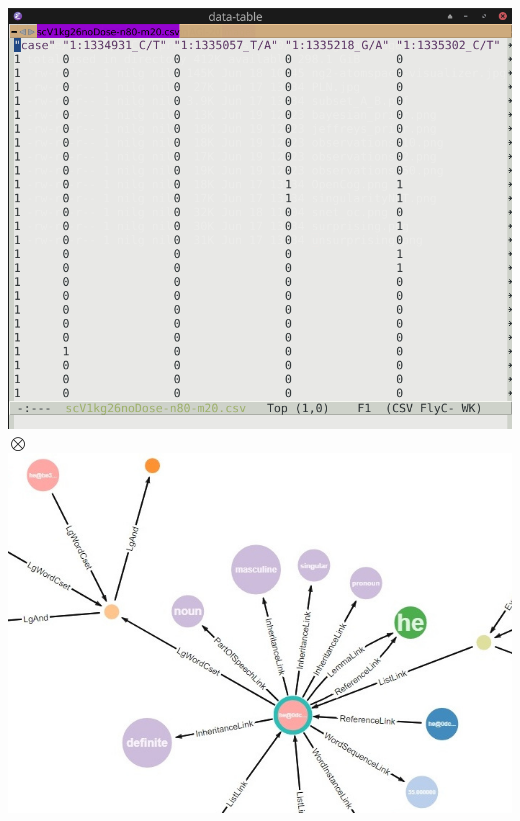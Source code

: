 \documentclass[aspectratio=169]{beamer}
\begin{document}
\begin{frame}
  \begin{columns}
    \column{5cm}
    \includegraphics[scale=0.15]{images/table.png}
    \column{0.3cm}
    $\bigotimes$
    \column{5cm}
    \includegraphics[scale=0.3]{images/atomspace.jpg}
  \end{columns}
  \pause
\end{frame}
\end{document}
